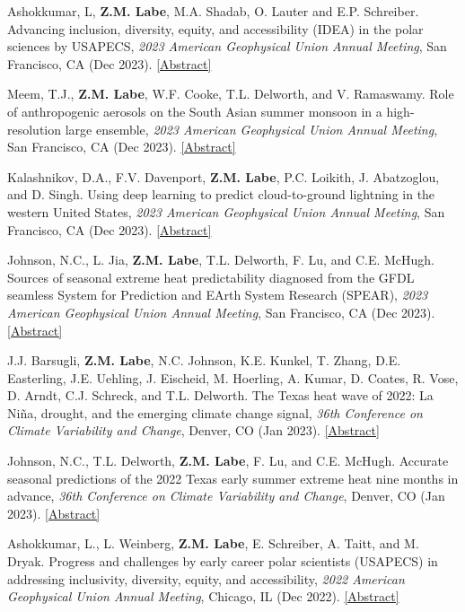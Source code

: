 \documentclass[margin,line,palatino,courier,10pt]{res}
\begin{document}
\begin{resume}
\begin{etaremune}[leftmargin=0in,topsep=0in,parsep=0in]
\item Ashokkumar, L, \textbf{Z.M. Labe}, M.A. Shadab, O. Lauter and E.P. Schreiber. Advancing inclusion, diversity, equity, and accessibility (IDEA) in the polar sciences by USAPECS, \textit{2023 American Geophysical Union Annual Meeting}, San Francisco, CA (Dec 2023). \href{https://agu.confex.com/agu/fm23/meetingapp.cgi/Paper/1431736}{[Abstract]}
\item Meem, T.J., \textbf{Z.M. Labe}, W.F. Cooke, T.L. Delworth, and V. Ramaswamy. Role of anthropogenic aerosols on the South Asian summer monsoon in a high-resolution large ensemble, \textit{2023 American Geophysical Union Annual Meeting}, San Francisco, CA (Dec 2023). \href{https://agu.confex.com/agu/fm23/meetingapp.cgi/Paper/1291065}{[Abstract]}
\item Kalashnikov, D.A., F.V. Davenport, \textbf{Z.M. Labe}, P.C. Loikith, J. Abatzoglou, and D. Singh. Using deep learning to predict cloud-to-ground lightning in the western United States, \textit{2023 American Geophysical Union Annual Meeting}, San Francisco, CA (Dec 2023). \href{https://agu.confex.com/agu/fm23/meetingapp.cgi/Paper/1331607}{[Abstract]}
\item Johnson, N.C., L. Jia, \textbf{Z.M. Labe}, T.L. Delworth, F. Lu, and C.E. McHugh. Sources of seasonal extreme heat predictability diagnosed from the GFDL seamless System for Prediction and EArth System Research (SPEAR), \textit{2023 American Geophysical Union Annual Meeting}, San Francisco, CA (Dec 2023). \href{https://agu.confex.com/agu/fm23/meetingapp.cgi/Paper/1293219}{[Abstract]}
\item J.J. Barsugli, \textbf{Z.M. Labe}, N.C. Johnson, K.E. Kunkel, T. Zhang, D.E. Easterling, J.E. Uehling, J. Eischeid, M. Hoerling, A. Kumar, D. Coates, R. Vose, D. Arndt, C.J. Schreck, and T.L. Delworth. The Texas heat wave of 2022: La Niña, drought, and the emerging climate change signal, \textit{36th Conference on Climate Variability and Change}, Denver, CO (Jan 2023). \href{https://ams.confex.com/ams/103ANNUAL/meetingapp.cgi/Paper/421815}{[Abstract]}
\item Johnson, N.C., T.L. Delworth, \textbf{Z.M. Labe}, F. Lu, and C.E. McHugh. Accurate seasonal predictions of the 2022 Texas early summer extreme heat nine months in advance, \textit{36th Conference on Climate Variability and Change}, Denver, CO (Jan 2023). \href{https://ams.confex.com/ams/103ANNUAL/meetingapp.cgi/Paper/418044}{[Abstract]}
\item Ashokkumar, L., L. Weinberg, \textbf{Z.M. Labe}, E. Schreiber, A. Taitt, and M. Dryak. Progress and challenges by early career polar scientists (USAPECS) in addressing inclusivity, diversity, equity, and accessibility, \textit{2022 American Geophysical Union Annual Meeting}, Chicago, IL (Dec 2022). \href{https://agu.confex.com/agu/fm22/meetingapp.cgi/Paper/1192493}{[Abstract]}

\end{etaremune}
\end{resume}
\end{document}
